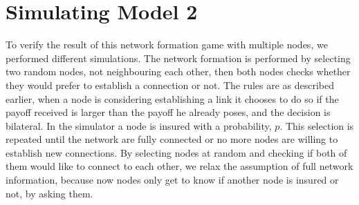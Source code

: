 \section{Simulating Model 2}
To verify the result of this network formation game with multiple nodes, we performed different simulations. The network formation is performed by selecting two random nodes, not neighbouring each other, then both nodes checks whether they would prefer to establish a connection or not. The rules are as described earlier, when a node is considering establishing a link it chooses to do so if the payoff received is larger than the payoff he already poses, and the decision is bilateral. 
In the simulator a node is insured with a probability, $p$. This selection is repeated until the network are fully connected or no more nodes are willing to establish new connections.
By selecting nodes at random and checking if both of them would like to connect to each other, we relax the assumption of full network information, because now nodes only get to know if another node is insured or not, by asking them.

